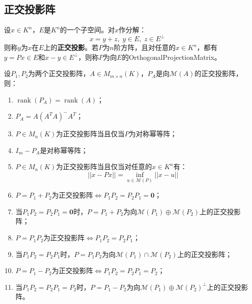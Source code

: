 \subsection{正交投影阵}
\begin{definition}
	设$x\in K^n$，$E$是$K^n$的一个子空间。对$x$作分解：
	\begin{equation*}
		x=y+z,\;y\in E,\;z\in E^\perp
	\end{equation*}
	则称$y$为$x$在$E$上的\textbf{正交投影}。若$P$为$n$阶方阵，且对任意的$x\in K^n$，都有$y=Px\in E$和$x-y\in E^\perp$，则称$P$为向$E$的\gls{OrthogonalProjectionMatrix}。
\end{definition}
\begin{property}\label{prop:OrthogonalProjectionMat}
	设$P_1,P_2$为两个正交投影阵，$A\in M_{m\times n}(K)$，$P_A$是向$\mathcal{M}(A)$的正交投影阵，则：
	\begin{enumerate}
		\item $\operatorname{rank}(P_A)=\operatorname{rank}(A)$；
		\item $P_A=A(A^TA)^-A^T$；
		\item $P\in M_{n}(K)$为正交投影阵当且仅当$P$为对称幂等阵；
		\item $I_m-P_A$是对称幂等阵；
		\item $P\in M_{n}(K)$为正交投影阵当且仅当对任意的$x\in K^n$有：
		\begin{equation*}
			||x-Px||=\inf_{u\in\mathcal{M}(P)}||x-u||
		\end{equation*}
		\item $P=P_1+P_2$为正交投影阵$\Leftrightarrow P_1P_2=P_2P_1=\mathbf{0}$；
		\item 当$P_1P_2=P_2P_1=\mathbf{0}$时，$P=P_1+P_2$为向$\mathcal{M}(P_1)\oplus\mathcal{M}(P_2)$上的正交投影阵；
		\item $P=P_1P_2$为正交投影阵$\Leftrightarrow P_1P_2=P_2P_1$；
		\item 当$P_1P_2=P_2P_1$时，$P=P_1P_2$为向$\mathcal{M}(P_1)\cap\mathcal{M}(P_2)$上的正交投影阵；
		\item $P=P_1-P_2$为正交投影阵$\Leftrightarrow P_1P_2=P_2P_1=P_2$；
		\item 当$P_1P_2=P_2P_1=P_2$时，$P=P_1-P_2$为向$\mathcal{M}(P_1)\oplus\mathcal{M}(P_2)^\perp$上的正交投影阵。
	\end{enumerate}
\end{property}
